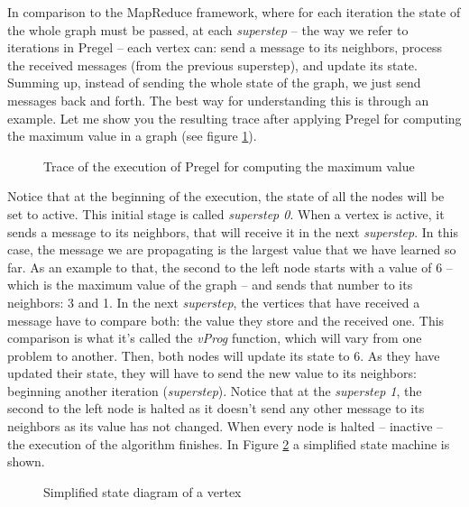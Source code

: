 In comparison to the MapReduce framework, where for each iteration the state of the whole graph must be passed, at each \textit{superstep} -- the way we refer to iterations in Pregel -- each vertex can: send a message to its neighbors, process the received messages (from the previous superstep), and update its state. Summing up, instead of sending the whole state of the graph, we just send messages back and forth. The best way for understanding this is through an example. Let me show you the resulting trace after applying Pregel for computing the maximum value in a graph (see figure \ref{fig:pregel}).

\begin{figure}[ht]
    \centering
    
    \caption[Trace of the execution of Pregel for computing the maximum value]{Trace of the execution of Pregel for computing the maximum value~\cite{10.1145/1807167.1807184}}
    \label{fig:pregel}
\end{figure}

Notice that at the beginning of the execution, the state of all the nodes will be set to active. This initial stage is called \textit{superstep 0}. When a vertex is active, it sends a message to its neighbors, that will receive it in the next \textit{superstep}. In this case, the message we are propagating is the largest value that we have learned so far. As an example to that, the second to the left node starts with a value of 6 -- which is the maximum value of the graph -- and sends that number to its neighbors: 3 and 1. In the next \textit{superstep}, the vertices that have received a message have to compare both: the value they store and the received one. This comparison is what it's called the \textit{vProg} function, which will vary from one problem to another. Then, both nodes will update its state to 6. As they have updated their state, they will have to send the new value to its neighbors: beginning another iteration (\textit{superstep}). Notice that at the \textit{superstep 1}, the second to the left node is halted as it doesn't send any other message to its neighbors as its value has not changed. When every node is halted -- inactive -- the execution of the algorithm finishes. In Figure \ref{fig:state} a simplified state machine is shown.

\begin{figure}[ht]
    \centering
    
    \caption[Simplified state diagram of a vertex]{Simplified state diagram of a vertex~\cite{10.1145/1807167.1807184}}
    \label{fig:state}
\end{figure}

